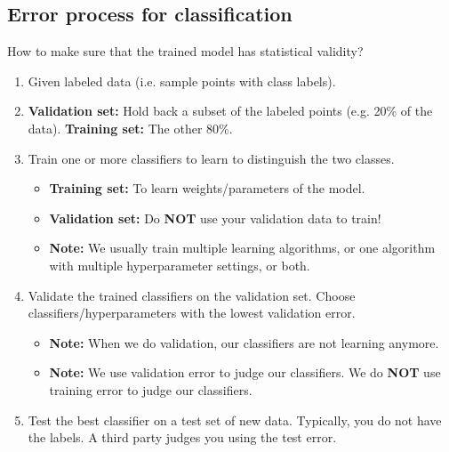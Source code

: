 \subsection{Error process for classification}
\begin{process}
    How to make sure that the trained model has statistical validity?

    \begin{enumerate}
        \item Given labeled data (i.e. sample points with class labels).
        \item \textbf{Validation set:} Hold back a subset of the labeled points (e.g. 20\% of the data). \textbf{Training set:} The other 80\%.
        \item Train one or more classifiers to learn to distinguish the two classes. 
        \begin{itemize}
            \item \textbf{Training set:} To learn weights/parameters of the model. 
            \item \textbf{Validation set:} Do \textbf{NOT} use your validation data to train!
            \item \textbf{Note:} We usually train multiple learning algorithms, or one algorithm with multiple hyperparameter settings, or both.
        \end{itemize}
        \item Validate the trained classifiers on the validation set. Choose classifiers/hyperparameters with the lowest validation error.
        \begin{itemize}
            \item \textbf{Note:} When we do validation, our classifiers are not learning anymore.
    
            \item \textbf{Note:} We use validation error to judge our classifiers. We do \textbf{NOT} use training error to judge our classifiers.
        \end{itemize}
        \item Test the best classifier on a test set of new data. Typically, you do not have the labels. A third party judges you using the test error.
    \end{enumerate}
\end{process}

